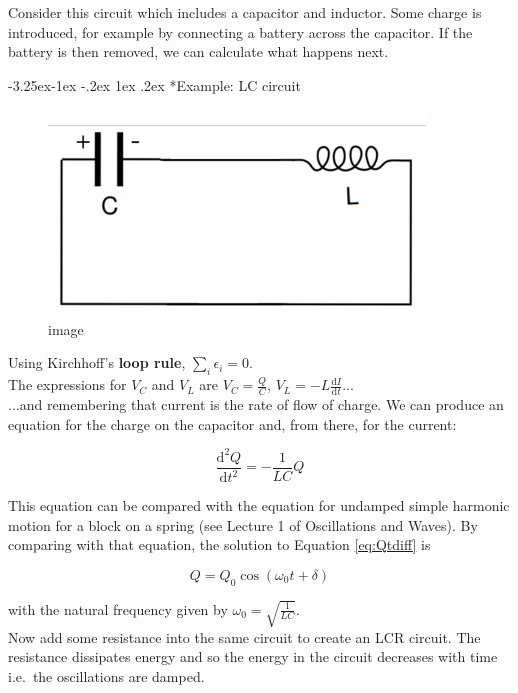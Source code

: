 \documentclass[
]{book}
\makeatletter
\renewcommand\subsection{%
\@startsection{subsection}{2}{\z@}%
              {-3.25ex\@plus -1ex \@minus -.2ex}%
              {1ex \@plus .2ex}%
              {\sffamily\bfseries}}
\numberwithin{equation}{section}
\makeatother
\begin{document}
Consider this circuit which includes a capacitor and inductor. Some
charge is introduced, for example by connecting a battery across the
capacitor. If the battery is then removed, we can calculate what happens
next.

\hypertarget{example-lc-circuit}{%
\subsection*{Example: LC circuit}\label{example-lc-circuit}}

\begin{figure}
\centering
\includegraphics[width=100mm,height=\textheight]{Figures/LC_circuit.png}
\caption{image}
\end{figure}

Using Kirchhoff's \textbf{loop rule}, \(\sum_i \epsilon_i = 0\).\\
The expressions for \(V_C\) and \(V_L\) are \(V_C = \frac{Q}{C}\),
\(V_L = -L \frac{\mathrm{d} I}{\mathrm{d} t}\)...\\
...and remembering that current is the rate of flow of charge. We can
produce an equation for the charge on the capacitor and, from there, for
the current:

\begin{equation}
\label{eq:QtDiff}
\frac{\mathrm{d}^2 Q}{\mathrm{d} t^2} = - \frac{1}{LC} Q
\end{equation}

This equation can be compared with the equation for undamped simple
harmonic motion for a block on a spring (see Lecture 1 of Oscillations
and Waves). By comparing with that equation, the solution to Equation \eqref{eq:Qtdiff} is

\begin{equation}
\label{eq:Qsolution}
Q = Q_0 \cos⁡(\omega_0 t + \delta)
\end{equation}

with the natural frequency given by \(\omega_0 = \sqrt{ \frac{1}{LC} }\).\\
Now add some resistance into the same circuit to create an LCR circuit.
The resistance dissipates energy and so the energy in the circuit
decreases with time i.e.~the oscillations are damped.
\end{document}
